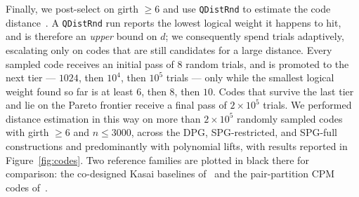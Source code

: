Finally, we post-select on girth $\geq 6$ and use \texttt{QDistRnd} to estimate the code distance~\cite{Pryadko_2022}. A \texttt{QDistRnd} run reports the lowest logical weight it happens to hit, and is therefore an \emph{upper} bound on $d$; we consequently spend trials adaptively, escalating only on codes that are still candidates for a large distance. Every sampled code receives an initial pass of $8$ random trials, and is promoted to the next tier --- $1024$, then $10^4$, then $10^5$ trials --- only while the smallest logical weight found so far is at least $6$, then $8$, then $10$. Codes that survive the last tier and lie on the Pareto frontier receive a final pass of $2\times10^5$ trials. We performed distance estimation in this way on more than $2\times10^5$ randomly sampled codes with girth $\geq 6$ and $n\leq 3000$, across the DPG, SPG-restricted, and SPG-full constructions and predominantly with polynomial lifts, with results reported in Figure~\ref{fig:codes}. Two reference families are plotted in black there for comparison: the co-designed Kasai baselines of~\cite{zhao2026ultrahighratequantumerrorcorrection} and the pair-partition CPM codes of~\cite{okada2026pairpartitionconstructionscpmbasedquantum}.

